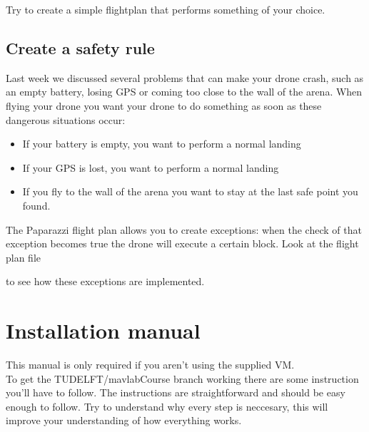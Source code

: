 \documentclass{article}
\begin{document}
Try to create a simple flightplan that performs something of your choice. 

\subsection*{Create a safety rule}
Last week we discussed several problems that can make your drone crash, such as an empty battery, losing GPS or coming too close to the wall of the arena.
When flying your drone you want your drone to do something as soon as these dangerous situations occur:
\begin{itemize}
\item If your battery is empty, you want to perform a normal landing
\item If your GPS is lost, you want to perform a normal landing
\item If you fly to the wall of the arena you want to stay at the last safe point you found. 
\end{itemize}
The Paparazzi flight plan allows you to create exceptions: when the check of that exception becomes true the drone will execute a certain block. Look at the flight plan file 

 to see how these exceptions are implemented. 

\section*{Installation manual}

This manual is only required if you aren't using the supplied VM.\\

\noindent To get the TUDELFT/mavlabCourse branch working there are some instruction you'll have to follow. The instructions are straightforward and should be easy enough to follow. Try to understand why every step is neccesary, this will improve your understanding of how everything works.
\end{document}
